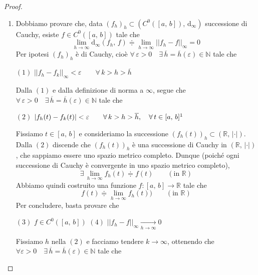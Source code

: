 \begin{proof}
\begin{enumerate}[labelindent=\parindent,leftmargin=*,label=\textnormal{(\roman*)},start=1]
\item Dobbiamo provare che, data $(f_h)_h \subset \left( C^0([a,\,b]),\,\mathrm{d}_{\infty} \right)$ successione di Cauchy, esiste $f \in C^0([a,\,b])$ tale che
$$
\lim_{h \rightarrow \infty} \mathrm{d}_{\infty} (f_h,\,f) \doteqdot \lim_{h \rightarrow \infty} ||f_h-f||_{\infty} = 0
$$
Per ipotesi $(f_h)_h$ è di Cauchy, cioè $\forall \, \varepsilon > 0 \quad \exists \, \overline{h} = \overline{h}(\varepsilon) \in \mathbb{N}$ tale che
\begin{center}
$\mathrm{(1)}$
\hfill
$\displaystyle
||f_h-f_k||_{\infty} < \varepsilon \qquad \forall \, k > h > \overline{h}
$
\hfill \null \\
\end{center}
Dalla $\mathrm{(1)}$ e dalla definizione di norma a $\infty$, segue che $\forall \, \varepsilon > 0 \quad \exists \, \overline{h} = \overline{h}(\varepsilon) \in \mathbb{N}$ tale che
\begin{center}
$\mathrm{(2)}$
\hfill
$\displaystyle
\left| f_h(t)-f_k(t) \right| < \varepsilon \qquad \forall \, k > h > \overline{h}, \quad \forall \, t \in [a,\,b]\footnotemark
$
\hfill \null \\
\end{center}
Fissiamo $t \in [a,\,b]$ e consideriamo la successione $(f_h(t))_h \subset (\mathbb{R},\,|\cdot|)$. Dalla $\mathrm{(2)}$ discende che $(f_h(t))_h$ è una successione di Cauchy in $(\mathbb{R},\,|\cdot|)$, che sappiamo essere uno spazio metrico completo. Dunque (poiché ogni successione di Cauchy è convergente in uno spazio metrico completo),
$$
\exists \, \lim_{h \rightarrow \infty} f_h(t) \doteqdot f(t) \qquad (\text{in } \mathbb{R})
$$
Abbiamo quindi costruito una funzione $f: [a,\,b] \longrightarrow \mathbb{R}$ tale che
$$
f(t) \doteqdot \lim_{h \rightarrow \infty} f_h(t)) \qquad (\text{in } \mathbb{R})
$$
Per concludere, basta provare che
\begin{center}
$\mathrm{(3)}$
\hfill
$\displaystyle
f \in C^0([a,\,b])
$
\hfill \null \vskip 0pt
$\mathrm{(4)}$
\hfill
$\displaystyle
||f_h-f||_{\infty} \underset{h \rightarrow \infty}{\longrightarrow} 0
$
\hfill \null \\
\end{center}
Fissiamo $h$ nella $\mathrm{(2)}$ e facciamo tendere $k \rightarrow \infty$, ottenendo che $\forall \varepsilon > 0 \quad \exists \, \overline{h} = \overline{h}(\varepsilon) \in \mathbb{N}$ tale che

\end{enumerate}
\end{proof}
